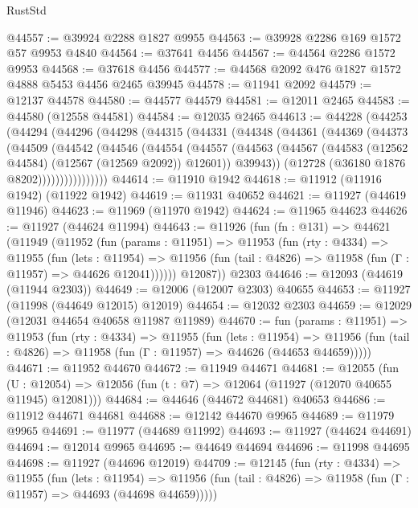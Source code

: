 \begin{lexlean}{RustStd}
\begin{coremodule}
@44557 := @39924 @2288 @1827 @9955
@44563 := @39928 @2286 @169 @1572 @57 @9953 @4840
@44564 := @37641 @4456
@44567 := @44564 @2286 @1572 @9953
@44568 := @37618 @4456
@44577 := @44568 @2092 @476 @1827 @1572 @4888 @5453 @4456 @2465 @39945
@44578 := @11941 @2092
@44579 := @12137 @44578
@44580 := @44577 @44579
@44581 := @12011 @2465
@44583 := @44580 (@12558 @44581)
@44584 := @12035 @2465
@44613 := @44228
    (@44253
      (@44294
        (@44296
          (@44298
            (@44315
              (@44331
                (@44348
                  (@44361
                    (@44369
                      (@44373
                        (@44509
                          (@44542
                            (@44546
                              (@44554
                                (@44557
                                  (@44563
                                    (@44567 (@44583 (@12562 @44584) (@12567 (@12569 @2092)) @12601))
                                    @39943))
                                (@12728 (@36180 @1876 @8202))))))))))))))))
@44614 := @11910 @1942
@44618 := @11912 (@11916 @1942) (@11922 @1942)
@44619 := @11931 @40652
@44621 := @11927 (@44619 @11946)
@44623 := @11969 (@11970 @1942)
@44624 := @11965 @44623
@44626 := @11927 (@44624 @11994)
@44643 := @11926
    (fun (fn : @131) =>
    @44621
      (@11949
        (@11952
          (fun (params : @11951) =>
          @11953
            (fun (rty : @4334) =>
            @11955
              (fun (lets : @11954) =>
              @11956 (fun (tail : @4826) => @11958 (fun (Γ : @11957) => @44626 @12041))))))
        @12087))
    @2303
@44646 := @12093 (@44619 (@11944 @2303))
@44649 := @12006 (@12007 @2303) @40655
@44653 := @11927 (@11998 (@44649 @12015) @12019)
@44654 := @12032 @2303
@44659 := @12029 (@12031 @44654 @40658 @11987 @11989)
@44670 := fun (params : @11951) =>
  @11953
    (fun (rty : @4334) =>
    @11955
      (fun (lets : @11954) =>
      @11956 (fun (tail : @4826) => @11958 (fun (Γ : @11957) => @44626 (@44653 @44659)))))
@44671 := @11952 @44670
@44672 := @11949 @44671
@44681 := @12055
    (fun (U : @12054) => @12056 (fun (t : @7) => @12064 (@11927 (@12070 @40655 @11945) @12081)))
@44684 := @44646 (@44672 @44681) @40653
@44686 := @11912 @44671 @44681
@44688 := @12142 @44670 @9965
@44689 := @11979 @9965
@44691 := @11977 (@44689 @11992)
@44693 := @11927 (@44624 @44691)
@44694 := @12014 @9965
@44695 := @44649 @44694
@44696 := @11998 @44695
@44698 := @11927 (@44696 @12019)
@44709 := @12145
    (fun (rty : @4334) =>
    @11955
      (fun (lets : @11954) =>
      @11956 (fun (tail : @4826) => @11958 (fun (Γ : @11957) => @44693 (@44698 @44659)))))

\end{coremodule}
\end{lexlean}
